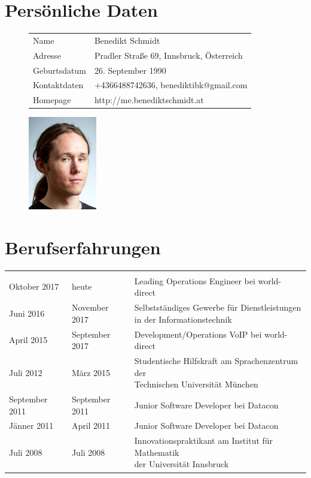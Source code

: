 


	\section*{Persönliche Daten}
	\begin{figure}[h]
		\begin{minipage}[b]{13cm}
			\begin{tabularx}{\textwidth}{b{4cm}|l}
				Name & Benedikt Schmidt \\
				Adresse & Pradler Straße 69, Innsbruck, Österreich \\
				Geburtsdatum & 26. September 1990 \\
				Kontaktdaten & +4366488742636, benediktibk@gmail.com \\
				Homepage & http://me.benediktschmidt.at
			\end{tabularx}
		\end{minipage}		
		\begin{minipage}[b]{3cm}
			\includegraphics[width=3cm]{portrait.jpg}
		\end{minipage}
	\end{figure}

	\section*{Berufserfahrungen}
	\begin{tabularx}{\textwidth}{b{4cm}|b{3cm}|l}
		\thead{von} & \thead{bis} & \\
		Oktober 2017 & heute & Leading Operations Engineer bei world-direct \\
		Juni 2016 & November 2017 & \makecell[cl]{Selbstständiges Gewerbe für Dienstleistungen \\ in der Informationstechnik} \\
		April 2015 & September 2017 & Development/Operations VoIP bei world-direct \\
		Juli 2012 & März 2015 & \makecell[cl]{Studentische Hilfskraft am Sprachenzentrum der \\ Technischen Universität München} \\
		September 2011 & September 2011 & Junior Software Developer bei Datacon \\
		Jänner 2011 & April 2011 & Junior Software Developer bei Datacon \\
		Juli 2008 & Juli 2008 & \makecell[cl]{Innovationspraktikant am Institut für Mathematik \\ der Universität Innsbruck}
	\end{tabularx}

